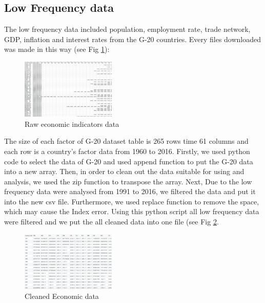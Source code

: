 \subsection{Low Frequency data}
The low frequency data included population, employment rate, trade network, GDP, inflation and interest rates from the G-20 countries. Every files downloaded was made in this way (see Fig \ref{raw_eco_data}): 
\newline

\begin{figure}[!h]
	\begin{center}
		\includegraphics[width=0.40\textwidth]{all_data.png}
		\caption{Raw economic indicators data}
		\label{raw_eco_data}
	\end{center}
\end{figure}

The size of each factor of G-20 dataset table is 265 rows time 61 columns and each row is a country's factor data  from 1960 to 2016.
Firstly, we used python code to select the data of G-20 and used append function to put the G-20 data into a new array.
Then,  in order to clean out the data suitable for using and analysis, we used the zip function to transpose the array.
Next, Due to the low frequency data were analysed from 1991 to 2016, we filtered the data and put it into the new csv file.
Furthermore, we used replace function to remove the space, which may cause the Index error.  Using this python script all low frequency data were filtered and we put the all cleaned data into one file (see Fig \ref{cleaned_eco_data}.
\newline

\begin{figure}[!h]
	\begin{center}
		\includegraphics[width=0.40\textwidth]{Capture.JPG}
		\caption{Cleaned Economic data}
		\label{cleaned_eco_data}
	\end{center}
\end{figure}

